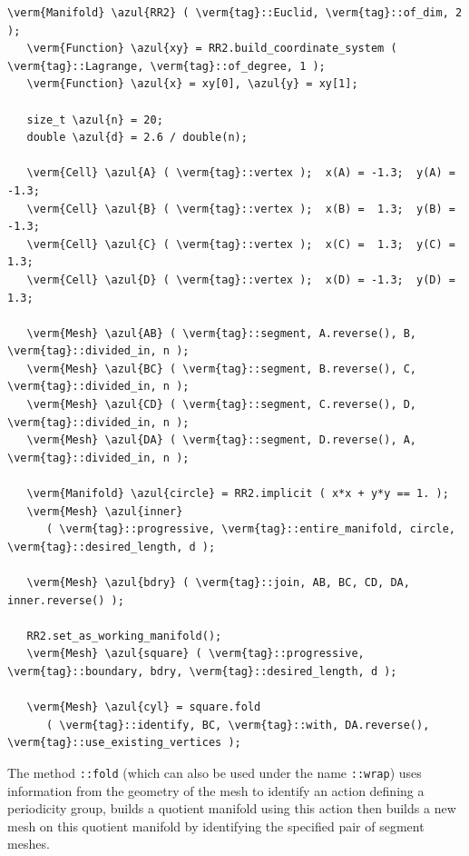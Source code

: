 \begin{Verbatim}[commandchars=\\\{\},formatcom=\small\tt,frame=single,
   label=parag-\ref{\numb section 7.\numb parag 14}.cpp,rulecolor=\color{coment},
   baselinestretch=0.94,framesep=2mm                                             ]
   \verm{Manifold} \azul{RR2} ( \verm{tag}::Euclid, \verm{tag}::of_dim, 2 );
   \verm{Function} \azul{xy} = RR2.build_coordinate_system ( \verm{tag}::Lagrange, \verm{tag}::of_degree, 1 );
   \verm{Function} \azul{x} = xy[0], \azul{y} = xy[1];

   size_t \azul{n} = 20;
   double \azul{d} = 2.6 / double(n);

   \verm{Cell} \azul{A} ( \verm{tag}::vertex );  x(A) = -1.3;  y(A) = -1.3;
   \verm{Cell} \azul{B} ( \verm{tag}::vertex );  x(B) =  1.3;  y(B) = -1.3;
   \verm{Cell} \azul{C} ( \verm{tag}::vertex );  x(C) =  1.3;  y(C) =  1.3;
   \verm{Cell} \azul{D} ( \verm{tag}::vertex );  x(D) = -1.3;  y(D) =  1.3;

   \verm{Mesh} \azul{AB} ( \verm{tag}::segment, A.reverse(), B, \verm{tag}::divided_in, n );
   \verm{Mesh} \azul{BC} ( \verm{tag}::segment, B.reverse(), C, \verm{tag}::divided_in, n );
   \verm{Mesh} \azul{CD} ( \verm{tag}::segment, C.reverse(), D, \verm{tag}::divided_in, n );
   \verm{Mesh} \azul{DA} ( \verm{tag}::segment, D.reverse(), A, \verm{tag}::divided_in, n );

   \verm{Manifold} \azul{circle} = RR2.implicit ( x*x + y*y == 1. );
   \verm{Mesh} \azul{inner}
      ( \verm{tag}::progressive, \verm{tag}::entire_manifold, circle, \verm{tag}::desired_length, d );

   \verm{Mesh} \azul{bdry} ( \verm{tag}::join, AB, BC, CD, DA, inner.reverse() );

   RR2.set_as_working_manifold();
   \verm{Mesh} \azul{square} ( \verm{tag}::progressive, \verm{tag}::boundary, bdry, \verm{tag}::desired_length, d );

   \verm{Mesh} \azul{cyl} = square.fold
      ( \verm{tag}::identify, BC, \verm{tag}::with, DA.reverse(), \verm{tag}::use_existing_vertices );
\end{Verbatim}

The method {\small\tt{}::fold} (which can also be used under the name
{\small\tt{}::wrap}) uses information from the geometry of the mesh
to identify an action defining a periodicity group,
builds a quotient manifold using this action then builds a new mesh on this quotient manifold
by identifying the specified pair of segment meshes.

